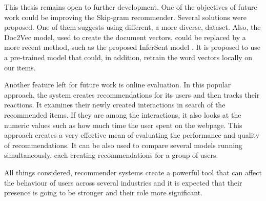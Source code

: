 This thesis remains open to further development. One of the objectives of future work could be improving the Skip-gram recommender. Several solutions were proposed. One of them suggests using different, a more diverse, dataset. Also, the Doc2Vec model, used to create the document vectors, could be replaced by a more recent method, such as the proposed InferSent model \cite{InferSent}. It is proposed to use a pre-trained model that could, in addition, retrain the word vectors locally on our items. 

Another feature left for future work is online evaluation. In this popular approach, the system creates recommendations for its users and then tracks their reactions. It examines their newly created interactions in search of the recommended items. If they are among the interactions, it also looks at the numeric values such as how much time the user spent on the webpage. This approach creates a very effective mean of evaluating the performance and quality of recommendations. It can be also used to compare several models running simultaneously, each creating recommendations for a group of users.  

All things considered, recommender systems create a powerful tool that can affect the behaviour of users across several industries and it is expected that their presence is going to be stronger and their role more significant. 
